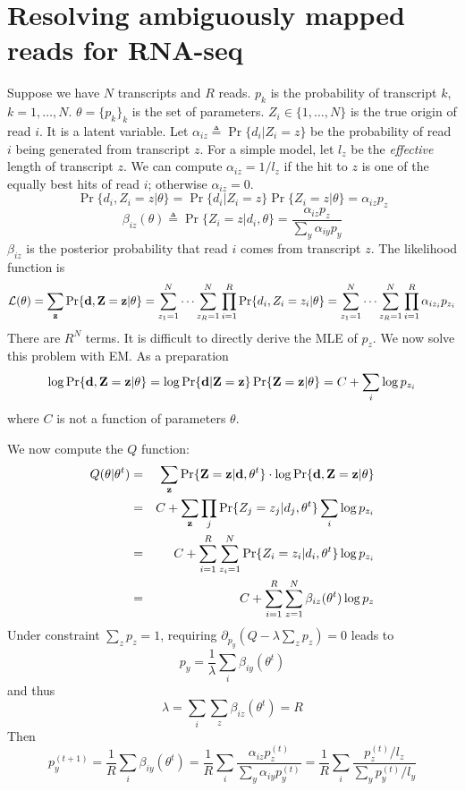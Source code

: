 \documentclass[10pt]{article}
\begin{document}
\newpage

\section{Resolving ambiguously mapped reads for RNA-seq}

Suppose we have $N$ transcripts and $R$ reads. $p_k$ is the probability of
transcript $k$, $k=1,\ldots,N$. $\theta=\{p_k\}_k$ is the set of parameters.
$Z_i\in\{1,\ldots,N\}$ is the true origin of read $i$. It is a latent variable.
Let $\alpha_{iz}\triangleq\Pr\{d_i|Z_i=z\}$ be the probability of read $i$
being generated from transcript $z$. For a simple model, let $l_z$ be the
\emph{effective} length of transcript $z$. We can compute $\alpha_{iz}=1/l_z$
if the hit to $z$ is one of the equally best hits of read $i$; otherwise
$\alpha_{iz}=0$.
\[
\Pr\{d_i,Z_i=z|\theta\}=\Pr\{d_i|Z_i=z\}\Pr\{Z_i=z|\theta\}=\alpha_{iz}p_z
\]
\[
\beta_{iz}(\theta)\triangleq\Pr\{Z_i=z|d_i,\theta\}=\frac{\alpha_{iz}p_z}{\sum_{y}\alpha_{iy}p_y}
\]
$\beta_{iz}$ is the posterior probability that read $i$ comes from transcript
$z$. The likelihood function is
$$
\mathcal{L}(\theta)=\sum_{\bf z}\Pr\{{\bf d},{\bf Z}={\bf z}|\theta\}=\sum_{z_1=1}^N\cdots\sum_{z_R=1}^N\prod_{i=1}^R\Pr\{d_i,Z_i=z_i|\theta\}
=\sum_{z_1=1}^N\cdots\sum_{z_R=1}^N\prod_{i=1}^R\alpha_{iz_i}p_{z_i}
$$
There are $R^N$ terms. It is difficult to directly derive the MLE of $p_z$.
We now solve this problem with EM. As a preparation
\[
\log\Pr\{{\bf d},{\bf Z}={\bf z}|\theta\}=\log\Pr\{{\bf d}|{\bf Z}={\bf z}\}\Pr\{{\bf Z}={\bf z}|\theta\}=C+\sum_i\log p_{z_i}
\]
where $C$ is not a function of parameters $\theta$.

We now compute the $Q$ function:
\begin{eqnarray*}
Q(\theta|\theta^t)&=&\sum_{{\bf z}}\Pr\{{\bf Z}={\bf z}|{\bf d},\theta^t\}\cdot\log\Pr\{{\bf d},{\bf Z}={\bf z}|\theta\}\\
&=&C+\sum_{{\bf z}}\prod_j\Pr\{Z_j=z_j|d_j,\theta^t\}\sum_i\log p_{z_i}\\
&=&C+\sum_{i=1}^R\sum_{z_i=1}^N\Pr\{Z_i=z_i|d_i,\theta^t\}\log p_{z_i}\\
&=&C+\sum_{i=1}^R\sum_{z=1}^N\beta_{iz}(\theta^t)\log p_z
\end{eqnarray*}
Under constraint $\sum_zp_z=1$, requiring
$\partial_{p_y}(Q-\lambda\sum_zp_z)=0$ leads to
\[
p_y=\frac{1}{\lambda}\sum_i\beta_{iy}(\theta^t)
\]
and thus
\[
\lambda=\sum_i\sum_z\beta_{iz}(\theta^t)=R
\]
Then
\[
p_y^{(t+1)}=\frac{1}{R}\sum_i\beta_{iy}(\theta^t)=\frac{1}{R}\sum_i\frac{\alpha_{iz}p^{(t)}_z}{\sum_{y}\alpha_{iy}p^{(t)}_y}=\frac{1}{R}\sum_i\frac{p_z^{(t)}/l_z}{\sum_yp_y^{(t)}/l_y}
\]
\end{document}
